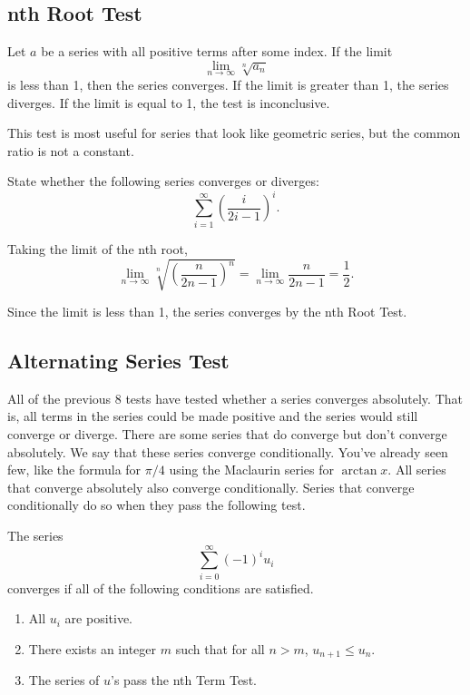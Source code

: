 \subsection{nth Root Test}
\begin{lemma}
	Let $a$ be a series with all positive terms after some index.
	If the limit
	\begin{equation*}
		\lim_{n\to\infty}{\sqrt[n]{a_n}}
	\end{equation*}
	is less than 1, then the series converges.
	If the limit is greater than 1, the series diverges.
	If the limit is equal to 1, the test is inconclusive.
\end{lemma}

This test is most useful for series that look like geometric series, but the common ratio is not a constant.

\begin{example}
	State whether the following series converges or diverges:
	\begin{equation*}
		\sum_{i=1}^{\infty}{\left(\frac{i}{2i-1}\right)^i}.
	\end{equation*}
\end{example}
\begin{answer}
	Taking the limit of the nth root,
	\begin{equation*}
		\lim_{n\to\infty}{\sqrt[n]{\left(\frac{n}{2n-1}\right)^n}} = \lim_{n\to\infty}{\frac{n}{2n-1}} = \frac{1}{2}.
	\end{equation*}
	
	Since the limit is less than 1, the series converges by the nth Root Test.
\end{answer}

\subsection{Alternating Series Test}
All of the previous 8 tests have tested whether a series converges absolutely.
That is, all terms in the series could be made positive and the series would still converge or diverge.
There are some series that do converge but don't converge absolutely.
We say that these series converge conditionally.
You've already seen  few, like the formula for $\pi/4$ using the Maclaurin series for $\arctan{x}$.
All series that converge absolutely also converge conditionally.
Series that converge conditionally do so when they pass the following test.

\begin{lemma}
	The series
	\begin{equation*}
		\sum_{i=0}^{\infty}{(-1)^iu_i}
	\end{equation*}
	converges if all of the following conditions are satisfied.
	\begin{enumerate}
		\item All $u_i$ are positive.
		\item There exists an integer $m$ such that for all $n > m$, $u_{n+1} \leq u_n$.
		\item The series of $u$'s pass the nth Term Test.
	\end{enumerate}
\end{lemma}

